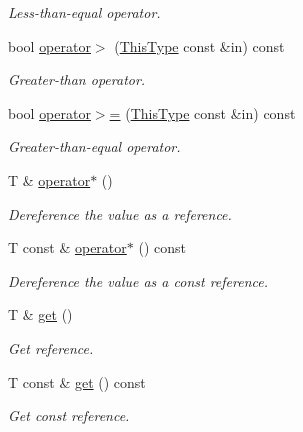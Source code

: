 \begin{DoxyCompactItemize}
\begin{DoxyCompactList}\small\item\em Less-\/than-\/equal operator. \end{DoxyCompactList}\item 
bool \hyperlink{structvt_1_1util_1_1strong_1_1detail_1_1_strong_a56fd64561dfd96f87d9d46a6df44ed04}{operator$>$} (\hyperlink{structvt_1_1util_1_1strong_1_1detail_1_1_strong_a510d40741bda362d97a4753919a577dd}{This\+Type} const \&in) const
\begin{DoxyCompactList}\small\item\em Greater-\/than operator. \end{DoxyCompactList}\item 
bool \hyperlink{structvt_1_1util_1_1strong_1_1detail_1_1_strong_a849dd3f84fc0c448715fcda4216a626a}{operator$>$=} (\hyperlink{structvt_1_1util_1_1strong_1_1detail_1_1_strong_a510d40741bda362d97a4753919a577dd}{This\+Type} const \&in) const
\begin{DoxyCompactList}\small\item\em Greater-\/than-\/equal operator. \end{DoxyCompactList}\item 
T \& \hyperlink{structvt_1_1util_1_1strong_1_1detail_1_1_strong_ab0423a5f73f3d080e84bab4db2bd10f8}{operator$\ast$} ()
\begin{DoxyCompactList}\small\item\em Dereference the value as a reference. \end{DoxyCompactList}\item 
T const  \& \hyperlink{structvt_1_1util_1_1strong_1_1detail_1_1_strong_a41a0ccceade5b4d7e2a3b67549ab142a}{operator$\ast$} () const
\begin{DoxyCompactList}\small\item\em Dereference the value as a const reference. \end{DoxyCompactList}\item 
T \& \hyperlink{structvt_1_1util_1_1strong_1_1detail_1_1_strong_a111bcf44f59fcedcecf4eb59fcb11460}{get} ()
\begin{DoxyCompactList}\small\item\em Get reference. \end{DoxyCompactList}\item 
T const  \& \hyperlink{structvt_1_1util_1_1strong_1_1detail_1_1_strong_aa84e50fbeaefbb74fb8843a3fb1368a7}{get} () const
\begin{DoxyCompactList}\small\item\em Get const reference. \end{DoxyCompactList}\end{DoxyCompactItemize}
